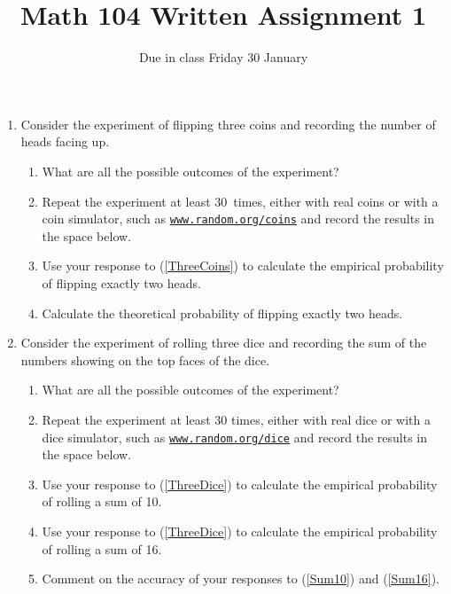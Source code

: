 \documentclass[12pt]{article}
\author{}\date{Due in class Friday 30 January}
\title{Math 104 Written Assignment 1}\author{}
\begin{document}
\maketitle
\pagestyle{empty}
\begin{enumerate}
\item Consider the experiment of flipping three coins
and recording the number of heads facing up.
\begin{enumerate}
\item What are all the possible outcomes of the experiment?
\vspace{1cm}
\item\label{ThreeCoins} Repeat the experiment at least 30~times,
either with real coins or with a coin simulator, such
as
\href{https://www.random.org/coins/?num=3&cur=60-usd.0025c-nj}{\tt www.random.org/coins}
and record the results in the space below.
\vspace{3cm}
\item Use your response to (\ref{ThreeCoins}) to calculate
the empirical probability of flipping exactly two heads.
\vspace{1cm}
\item Calculate the theoretical probability
of flipping exactly two heads.
\vspace{1cm}
\end{enumerate}

\item Consider the experiment of rolling three dice
and recording the sum of the numbers showing on the top faces
of the dice.
\begin{enumerate}
\item What are all the possible outcomes of the experiment?
\vspace{1cm}
\item\label{ThreeDice} Repeat the experiment at least 30 times,
either with real dice or with a dice simulator, such
as
\href{https://www.random.org/dice/?num=3}{\tt www.random.org/dice}
and record the results in the space below.
\vspace{3cm}
\item\label{Sum10} Use your response to (\ref{ThreeDice}) to calculate
the empirical probability of rolling a sum of 10.
\vspace{1cm}
\item\label{Sum16} Use your response to (\ref{ThreeDice}) to calculate
the empirical probability of rolling a sum of 16.
\vspace{1cm}
\item Comment on the accuracy of your responses to
(\ref{Sum10}) and (\ref{Sum16}).
\vspace{1cm}
\end{enumerate}
\end{enumerate}
\end{document}
